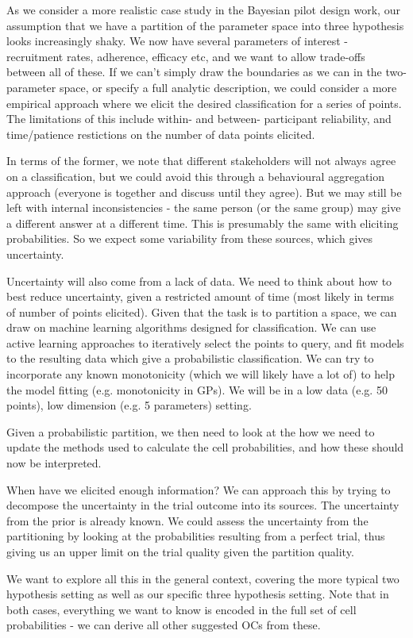 \documentclass{article} %
\begin{document}
As we consider a more realistic case study in the Bayesian pilot design work, our assumption that we have a partition of the parameter space into three hypothesis looks increasingly shaky. We now have several parameters of interest - recruitment rates, adherence, efficacy etc, and we want to allow trade-offs between all of these. If we can't simply draw the boundaries as we can in the two-parameter space, or specify a full analytic description, we could consider a more empirical approach where we elicit the desired classification for a series of points. The limitations of this include within- and between- participant reliability, and time/patience restictions on the number of data points elicited. 

In terms of the former, we note that different stakeholders will not always agree on a classification, but we could avoid this through a behavioural aggregation approach (everyone is together and discuss until they agree). But we may still be left with internal inconsistencies - the same person (or the same group) may give a different answer at a different time. This is presumably the same with eliciting probabilities. So we expect some variability from these sources, which gives uncertainty.

Uncertainty will also come from a lack of data. We need to think about how to best reduce uncertainty, given a restricted amount of time (most likely in terms of number of points elicited). Given that the task is to partition a space, we can draw on machine learning algorithms designed for classification. We can use active learning approaches to iteratively select the points to query, and fit models to the resulting data which give a probabilistic classification. We can try to incorporate any known monotonicity (which we will likely have a lot of) to help the model fitting (e.g. monotonicity in GPs). We will be in a low data (e.g. 50 points), low dimension (e.g. 5 parameters) setting.

Given a probabilistic partition, we then need to look at the how we need to update the methods used to calculate the cell probabilities, and how these should now be interpreted.

When have we elicited enough information? We can approach this by trying to decompose the uncertainty in the trial outcome into its sources. The uncertainty from the prior is already known. We could assess the uncertainty from the partitioning by looking at the probabilities resulting from a perfect trial, thus giving us an upper limit on the trial quality given the partition quality. 

We want to explore all this in the general context, covering the more typical two hypothesis setting as well as our specific three hypothesis setting. Note that in both cases, everything we want to know is encoded in the full set of cell probabilities - we can derive all other suggested OCs from these. 



\end{document}
